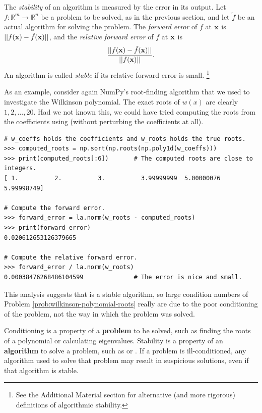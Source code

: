 The \emph{stability} of an algorithm is measured by the error in its output.
Let $f: \mathbb{R}^m \rightarrow \mathbb{R}^n$ be a problem to be solved, as in the previous section, and let $\tilde{f}$ be an actual algorithm for solving the problem.
The \emph{forward error} of $f$ at $\mathbf{x}$ is $||f(\mathbf{x})-\tilde f(\mathbf{x})||$, and the \emph{relative forward error} of $f$ at $\mathbf{x}$ is
\[
\frac{||f(\mathbf{x})-\tilde f(\mathbf{x})||}{||f(\mathbf{x})||}.
\]
An algorithm is called \emph{stable} if its relative forward error is small.%
\footnote{See the Additional Material section for alternative (and more rigorous) definitions of algorithmic stability.}

As an example, consider again NumPy's root-finding algorithm that we used to investigate the Wilkinson polynomial.
The exact roots of $w(x)$ are clearly $1,2,\ldots,20$.
Had we not known this, we could have tried computing the roots from the coefficients using  (without perturbing the coefficients at all).

\begin{lstlisting}
# w_coeffs holds the coefficients and w_roots holds the true roots.
>>> computed_roots = np.sort(np.roots(np.poly1d(w_coeffs)))
>>> print(computed_roots[:6])       # The computed roots are close to integers.
[ 1.          2.          3.          3.99999999  5.00000076  5.99998749]

# Compute the forward error.
>>> forward_error = la.norm(w_roots - computed_roots)
>>> print(forward_error)
0.020612653126379665

# Compute the relative forward error.
>>> forward_error / la.norm(w_roots)
0.00038476268486104599              # The error is nice and small.
\end{lstlisting}

This analysis suggests that  is a stable algorithm, so large condition numbers of Problem \ref{prob:wilkinson-polynomial-roots} really are due to the poor conditioning of the problem, not the way in which the problem was solved.

\begin{info} %
Conditioning is a property of a \textbf{problem} to be solved, such as finding the roots of a polynomial or calculating eigenvalues.
Stability is a property of an \textbf{algorithm} to solve a problem, such as  or .
If a problem is ill-conditioned, any algorithm used to solve that problem may result in suspicious solutions, even if that algorithm is stable.
\end{info}



